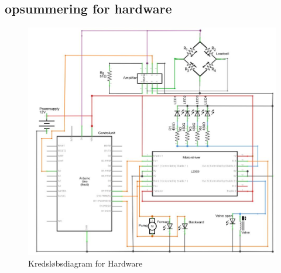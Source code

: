  
\subsection{opsummering for hardware} 

\begin{figure}[H]
	\centering
	\includegraphics[width=1\textwidth]{billeder/Hardware/diagrammer/HWdiagram.JPG}
	\caption{Kredsløbsdiagram for Hardware}
	\label{fig:HWdiagram}
\end{figure}
 